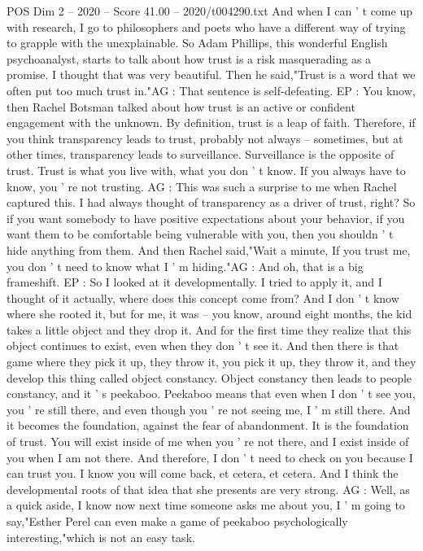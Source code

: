 \begin{textsample}{POS Dim 2 – 2020 – Score 41.00 – 2020/t004290.txt}
And when I can ' t come up with research, I go to philosophers and poets who have a different way of trying to grapple with the unexplainable.
So Adam Phillips, this wonderful English psychoanalyst, starts to talk about how trust is a risk masquerading as a promise.
I thought that was very beautiful.
Then he said,"Trust is a word that we often put too much trust in."AG : That sentence is self-defeating.
EP : You know, then Rachel Botsman talked about how trust is an active or confident engagement with the unknown.
By definition, trust is a leap of faith.
Therefore, if you think transparency leads to trust, probably not always -- sometimes, but at other times, transparency leads to surveillance.
Surveillance is the opposite of trust.
Trust is what you live with, what you don ' t know.
If you always have to know, you ' re not trusting.
AG : This was such a surprise to me when Rachel captured this.
I had always thought of transparency as a driver of trust, right?
So if you want somebody to have positive expectations about your behavior, if you want them to be comfortable being vulnerable with you, then you shouldn ' t hide anything from them.
And then Rachel said,"Wait a minute, If you trust me, you don ' t need to know what I ' m hiding."AG : And oh, that is a big frameshift.
EP : So I looked at it developmentally.
I tried to apply it, and I thought of it actually, where does this concept come from?
And I don ' t know where she rooted it, but for me, it was -- you know, around eight months, the kid takes a little object and they drop it.
And for the first time they realize that this object continues to exist, even when they don ' t see it.
And then there is that game where they pick it up, they throw it, you pick it up, they throw it, and they develop this thing called object constancy.
Object constancy then leads to people constancy, and it ' s peekaboo.
Peekaboo means that even when I don ' t see you, you ' re still there, and even though you ' re not seeing me, I ' m still there.
And it becomes the foundation, against the fear of abandonment.
It is the foundation of trust.
You will exist inside of me when you ' re not there, and I exist inside of you when I am not there.
And therefore, I don ' t need to check on you because I can trust you.
I know you will come back, et cetera, et cetera.
And I think the developmental roots of that idea that she presents are very strong.
AG : Well, as a quick aside, I know now next time someone asks me about you, I ' m going to say,"Esther Perel can even make a game of peekaboo psychologically interesting,"which is not an easy task.

\end{textsample}

